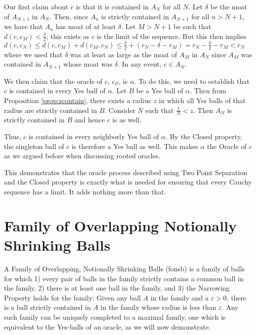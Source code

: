 \documentclass[12pt]{article}
\begin{document}
\begin{enumerate}
    Our first claim about $c$ is that it is contained in $A_N$ for all $N$. Let $\delta$ be the moat of $A_{N+1}$ in $A_N$. Then, since $A_n$ is strictly contained in $A_{N+1}$ for all $n > N+1$, we have that $A_n$ has moat of at least $\delta$. Let $M > N+1$ be such that $d(c, c_M) < \frac{\delta}{2}$; this exists as $c$ is the limit of the sequence. But this then implies $d(c, c_N) \leq d(c, c_M) + d(c_M, c_N) \leq \frac{\delta}{2} + (r_N - \delta - r_{M}) = r_N - \frac{\delta}{2} - r_{M} < r_N$ where we used that $\delta$ was at least as large as the moat of $A_M$ in $A_N$ since $A_M$ was contained in $A_{N+1}$ whose moat was $\delta$. In any event, $c \in A_N$. 

    We then claim that the oracle of $c$, $c_{\mathcal{O}}$, is $\alpha$. To do this, we need to establish that $c$ is contained in every Yes ball of $\alpha$. Let $B$ be a Yes ball of $\alpha$. Then from Proposition \ref{prop:zcontain}, there exists a radius $z$ in which all Yes balls of that radius are strictly contained in $B$. Consider $N$ such that $\frac{1}{N} < z$. Then $A_N$ is strictly contained in $B$ and hence $c$ is as well. 

    Thus, $c$ is contained in every neighborly Yes ball of $\alpha$. By the Closed property, the singleton ball of $c$ is therefore a Yes ball as well. This makes $\alpha$ the Oracle of $c$ as we argued before when discussing rooted oracles. 
\end{enumerate}

This demonstrates that the oracle process described using Two Point Separation and the Closed property is exactly what is needed for ensuring that every Cauchy sequence has a limit. It adds nothing more than that. 

\section{Family of Overlapping Notionally Shrinking Balls}

A Family of Overlapping, Notionally Shrinking Balls (fonsb) is a family of balls for which 1) every pair of balls in the family strictly contains a common ball in the family, 2) there is at least one ball in the family, and 3) the Narrowing Property holds for the family: Given any ball $A$ in the family and a $\varepsilon > 0$, there is a ball strictly contained in $A$ in the family whose radius is less than $\varepsilon$. Any such family can be uniquely completed to a maximal family, one which is equivalent to the Yes-balls of an oracle, as we will now demonstrate. 
\end{document}
